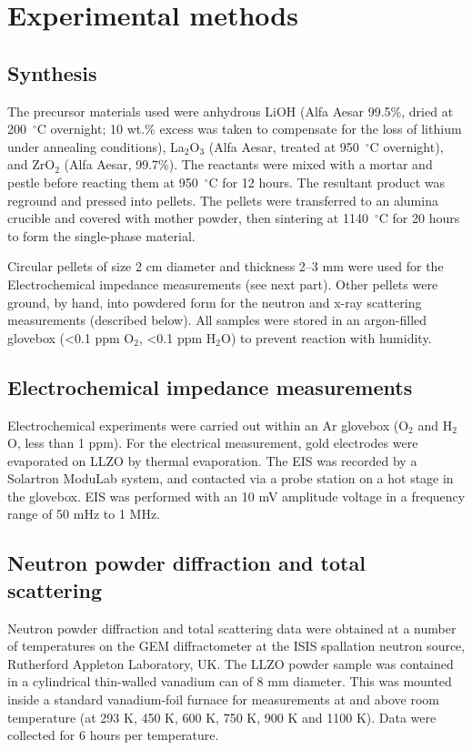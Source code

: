 \documentclass[twoside,twocolumn,9pt]{article}
\begin{document}
\section{Experimental methods}

\subsection{Synthesis}
The precursor materials used were anhydrous LiOH (Alfa Aesar 99.5\%, dried at 200~$^{\circ}$C overnight; 10 wt.\% excess was taken to compensate for the loss of lithium under annealing conditions), La$_2$O$_3$ (Alfa Aesar, treated at 950~$^{\circ}$C overnight), and ZrO$_2$ (Alfa Aesar, 99.7\%). The reactants were mixed with a mortar and pestle before reacting them at 950~$^{\circ}$C for 12 hours. The resultant product was reground and pressed into pellets. The pellets were transferred to an alumina crucible and covered with mother powder, then sintering at 1140~$^{\circ}$C for 20 hours to form the single-phase material. 

Circular pellets of size 2 cm diameter and thickness 2--3 mm were used for the Electrochemical impedance measurements (see next part). Other pellets were ground, by hand, into powdered form for the neutron and x-ray scattering measurements (described below). All samples were stored in an argon-filled glovebox (<0.1 ppm O$_2$, <0.1 ppm H$_2$O) to prevent reaction with humidity.

\subsection{Electrochemical impedance measurements}

Electrochemical experiments were carried out within an Ar glovebox (O$_2$ and H$_2$O, less than 1 ppm). For the electrical measurement,
gold electrodes were evaporated on LLZO by thermal evaporation. The EIS was recorded by a Solartron ModuLab system,
and contacted via a probe station on a hot stage in the glovebox. EIS was performed with an 10 mV amplitude voltage in a frequency range of 50 mHz to 1 MHz.

\subsection{Neutron powder diffraction and total scattering}

Neutron powder diffraction and total scattering data were obtained at a number of temperatures on the GEM diffractometer \cite{Hannon:2005cy} at the
ISIS spallation neutron source, Rutherford Appleton Laboratory, UK. The LLZO powder sample was contained in a cylindrical thin-walled vanadium can of 8 mm diameter. 
This was mounted inside a standard vanadium-foil furnace for measurements at and above room temperature (at 293 K, 450 K, 600 K, 750 K,
900 K and 1100 K). Data were collected for 6 hours per temperature.
\end{document}
